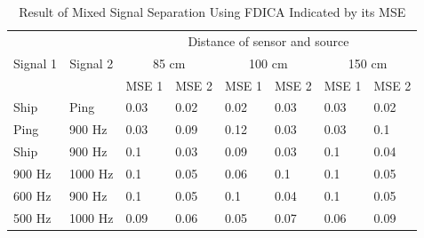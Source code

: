 \documentclass[a4paper]{jpconf}
\begin{document}
\begin{table}[h]
\centering
\caption{Result of Mixed Signal Separation Using FDICA Indicated by its MSE}
\label{table:msefdica}
\begin{tabular}{|l|l|l|l|l|l|l|l|}
\hline
\multicolumn{1}{|c|}{\multirow{3}{*}{Signal 1}} & \multicolumn{1}{c|}{\multirow{3}{*}{Signal 2}} & \multicolumn{6}{c|}{Distance of sensor and source}                                                                                                                          \\ \cline{3-8} 
\multicolumn{1}{|c|}{}                          & \multicolumn{1}{c|}{}                          & \multicolumn{2}{c|}{85 cm}                              & \multicolumn{2}{c|}{100 cm}                             & \multicolumn{2}{c|}{150 cm}                             \\ \cline{3-8} 
\multicolumn{1}{|c|}{}                          & \multicolumn{1}{c|}{}                          & \multicolumn{1}{c|}{MSE 1} & \multicolumn{1}{c|}{MSE 2} & \multicolumn{1}{c|}{MSE 1} & \multicolumn{1}{c|}{MSE 2} & \multicolumn{1}{c|}{MSE 1} & \multicolumn{1}{c|}{MSE 2} \\ \hline
Ship                                            & Ping                                           & 0.03                       & 0.02                       & 0.02                       & 0.03                       & 0.03                       & 0.02                       \\ \hline
Ping                                            & 900 Hz                                         & 0.03                       & 0.09                       & 0.12                       & 0.03                       & 0.03                       & 0.1                        \\ \hline
Ship                                            & 900 Hz                                         & 0.1                        & 0.03                       & 0.09                       & 0.03                       & 0.1                        & 0.04                       \\ \hline
900 Hz                                          & 1000 Hz                                        & 0.1                        & 0.05                       & 0.06                       & 0.1                        & 0.1                        & 0.05                       \\ \hline
600 Hz                                          & 900 Hz                                         & 0.1                        & 0.05                       & 0.1                        & 0.04                       & 0.1                        & 0.05                       \\ \hline
500 Hz                                          & 1000 Hz                                        & 0.09                       & 0.06                       & 0.05                       & 0.07                       & 0.06                       & 0.09                       \\ \hline
\end{tabular}
\end{table}
\end{document}
